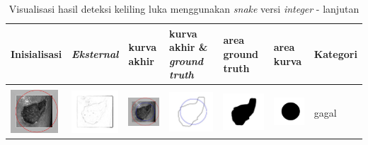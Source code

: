 \begin{table}[H]
	\centering
	\caption{Visualisasi hasil deteksi keliling luka menggunakan \emph{snake} versi \emph{integer} - lanjutan}
	\label{tabel_hasil_9}
	\begin{tabular}{|m{0.7in}|m{0.7in}|m{0.7in}|m{0.7in}|m{0.7in}|m{0.7in}|m{0.7in}|}
		\hline
		\textbf{Inisialisasi} & \textbf{\emph{Eksternal}} & \textbf{kurva akhir} & \textbf{kurva akhir \& \emph{ground truth}}& \textbf{area ground truth} & \textbf{area kurva} & \textbf{Kategori} \\
		\hline
		
		&  &  & & & &  \\
		\includegraphics[width=0.7in]{dataset/dataset_3/luka_merah/ready/26_integer_init.jpg}&
		\includegraphics[width=0.7in]{dataset/dataset_3/luka_merah/ready/26_integer_ext.jpg}&
		\includegraphics[width=0.7in]{dataset/dataset_3/luka_merah/ready/26_integer_result.jpg}&
		\includegraphics[width=0.7in]{dataset/dataset_3/luka_merah/ready/26_gt_r_integer.jpg}&
		\includegraphics[width=0.7in]{dataset/dataset_3/luka_merah/ready/26_r.jpg}&
		\includegraphics[width=0.7in]{dataset/dataset_3/luka_merah/ready/26_integer_r.jpg}&
		gagal\\
		\hline
		

\end{tabular}
\end{table}

